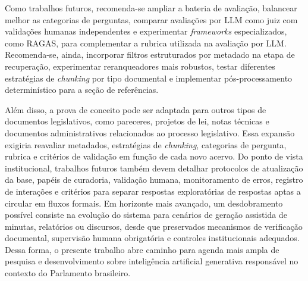 Como trabalhos futuros, recomenda-se ampliar a bateria de avaliação, balancear melhor as categorias de perguntas, comparar avaliações por LLM como juiz com validações humanas independentes e experimentar \textit{frameworks} especializados, como RAGAS, para complementar a rubrica utilizada na avaliação por LLM. Recomenda-se, ainda, incorporar filtros estruturados por metadado na etapa de recuperação, experimentar reranqueadores mais robustos, testar diferentes estratégias de \textit{chunking} por tipo documental e implementar pós-processamento determinístico para a seção de referências.

Além disso, a prova de conceito pode ser adaptada para outros tipos de documentos legislativos, como pareceres, projetos de lei, notas técnicas e documentos administrativos relacionados ao processo legislativo. Essa expansão exigiria reavaliar metadados, estratégias de \textit{chunking}, categorias de pergunta, rubrica e critérios de validação em função de cada novo acervo. Do ponto de vista institucional, trabalhos futuros também devem detalhar protocolos de atualização da base, papéis de curadoria, validação humana, monitoramento de erros, registro de interações e critérios para separar respostas exploratórias de respostas aptas a circular em fluxos formais. Em horizonte mais avançado, um desdobramento possível consiste na evolução do sistema para cenários de geração assistida de minutas, relatórios ou discursos, desde que preservados mecanismos de verificação documental, supervisão humana obrigatória e controles institucionais adequados. Dessa forma, o presente trabalho abre caminho para agenda mais ampla de pesquisa e desenvolvimento sobre inteligência artificial generativa responsável no contexto do Parlamento brasileiro.
